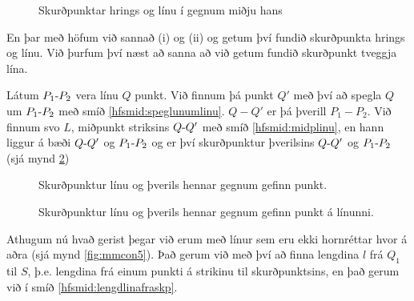 \begin{frame}
  \begin{figure}[H]
    \centering
    \ifglaerur
    
    \else
    
    \fi
    \caption{Skurðpunktar hrings og línu í gegnum miðju hans}
    \label{fig:mmcon3}
  \end{figure}
\end{frame}

\begin{frame}
  En þar með höfum við sannað (i) og (ii) og getum því fundið skurðpunkta
  hrings og línu. Við þurfum því næst að sanna að við getum fundið skurðpunkt
  tveggja lína.
\end{frame}

\begin{frame}
  \begin{hfsmid} \label{hfsmid:skplinuoghornrettarlinu}
    Látum \(\lin{P_1}{P_2}\) vera línu \(Q\) punkt. Við finnum þá punkt \(Q'\)
    með því að spegla \(Q\) um \(\lin{P_1}{P_2}\) með smíð \ref{hfsmid:speglunumlinu}.
    \(Q-Q'\) er þá þverill \(P_1-P_2\).
    Við finnum svo \(L\), miðpunkt striksins \(\lin{Q}{Q'}\) með smíð \ref{hfsmid:midplinu},
    en hann liggur á bæði \(\lin{Q}{Q'}\) og \(\lin{P_1}{P_2}\) og er því skurðpunktur
    þverilsins \(\lin{Q}{Q'}\) og \(\lin{P_1}{P_2}\) (sjá mynd \ref{fig:mmcon4})
  \end{hfsmid}
\end{frame}


\begin{frame}
  \begin{figure}[H]
    \centering
    \ifglaerur
    
    \else
    
    \fi
    \caption{Skurðpunktur línu og þverils hennar gegnum gefinn punkt.}
    \label{fig:mmcon4}
  \end{figure}
\end{frame}

\begin{frame}
  \begin{figure}[H]
    \centering
    
    \caption{Skurðpunktur línu og þverils hennar gegnum gefinn punkt á línunni.}
    \label{fig:mmcon6}
  \end{figure}
\end{frame}

\begin{frame}
  Athugum nú hvað gerist þegar við erum með línur sem eru ekki
  hornréttar hvor á aðra (sjá mynd \ref{fig:mmcon5}).
  Það gerum við með því að finna lengdina \(l\) frá \(Q_1\) til \(S\),
  þ.e. lengdina frá einum punkti á strikinu til skurðpunktsins, en það
  gerum við í smíð \ref{hfsmid:lengdlinafraskp}.

\end{frame}

